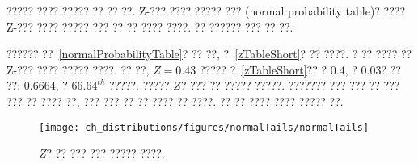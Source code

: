 ????? ???? ????? ?? ?? ??. Z-??? ???? ????? ??? (normal probability table)? ???? Z-??? ???? ????? ??? ?? ?? ???? ????. ?? ?????? ??? ?? ??.

?????? ??~\vref{normalProbabilityTable}? ?? ??, ?~\ref{zTableShort}? ?? ????. ? ?? ???? ?? Z-??? ???? ????? ????. ?? ??, $Z=0.43$ ????? ?~\ref{zTableShort}?? ? $0.4$, ? $0.03$? ?? ??: 0.6664, ? $66.64^{th}$ ?????. ????? $Z$? ??? ?? ????? ?????. ??????? ??? ??? ?? ??? ??? ?? ???? ??, ??? ??? ?? ?? ???? ?? ????. ?? ?? ???? ???? ????? ??.

\begin{figure}
\centering
\texttt{[image: ch\_distributions/figures/normalTails/normalTails]}
\caption{ $Z$? ?? ??? ??? ????? ????.}
\label{normalTails}
\end{figure}

